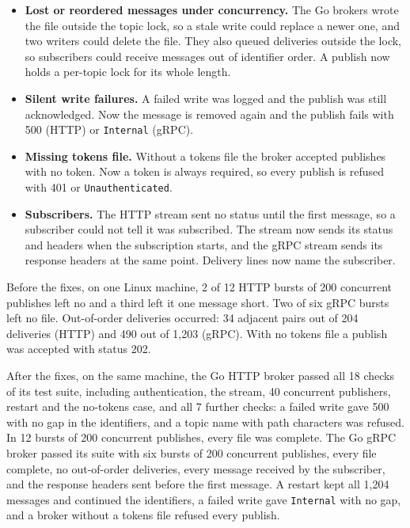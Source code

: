 \documentclass[12pt,a4paper]{article}
\begin{document}
\begin{itemize}
  \item \textbf{Lost or reordered messages under concurrency.} The Go brokers wrote
  the file outside the topic lock, so a stale write could replace a newer one, and
  two writers could delete the file. They also queued deliveries outside the lock,
  so subscribers could receive messages out of identifier order. A publish now holds
  a per-topic lock for its whole length.
  \item \textbf{Silent write failures.} A failed write was logged and the publish was
  still acknowledged. Now the message is removed again and the publish fails with
  500 (HTTP) or \texttt{Internal} (gRPC).
  \item \textbf{Missing tokens file.} Without a tokens file the broker accepted
  publishes with no token. Now a token is always required, so every publish is
  refused with 401 or \texttt{Unauthenticated}.
  \item \textbf{Subscribers.} The HTTP stream sent no status until the first message,
  so a subscriber could not tell it was subscribed. The stream now sends its status
  and headers when the subscription starts, and the gRPC stream sends its response
  headers at the same point. Delivery lines now name the subscriber.
\end{itemize}

Before the fixes, on one Linux machine, 2 of 12 HTTP bursts of 200 concurrent
publishes left no  and a third left it one message short. Two
of six gRPC bursts left no file. Out-of-order deliveries occurred: 34 adjacent pairs out of
204 deliveries (HTTP) and 490 out of 1{,}203 (gRPC). With no tokens file a publish was
accepted with status 202.

After the fixes, on the same machine, the Go HTTP broker passed all 18 checks of its
test suite, including authentication, the stream, 40 concurrent publishers, restart
and the no-tokens case, and all 7 further checks: a failed write gave 500 with no gap
in the identifiers, and a topic name with path characters was refused. In 12 bursts of
200 concurrent publishes, every file was complete. The Go gRPC broker passed its suite
with six bursts of 200 concurrent publishes, every file complete, no out-of-order
deliveries, every message received by the subscriber, and the response headers sent
before the first message. A restart kept all 1{,}204 messages and continued the
identifiers, a failed write gave \texttt{Internal} with no gap, and a broker without
a tokens file refused every publish.
\end{document}
